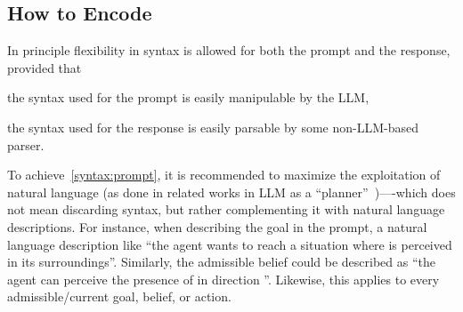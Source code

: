 \documentclass[12pt,a4paper,openright,twoside]{book}
\begin{document}
\subsection{How to Encode}\label{sec:prompt-encoding}

In principle flexibility in syntax is allowed for both the prompt and the response,
provided that
%
\begin{inlinelist}
    \item\label{syntax:prompt} the syntax used for the prompt is easily manipulable by the \ac{LLM},
    \item\label{syntax:response} the syntax used for the response is easily parsable by some non-\ac{LLM}-based parser.
\end{inlinelist}


To achieve~\ref{syntax:prompt}, it is recommended to maximize the exploitation of natural language (as done in related works in \ac{LLM} as a ``planner''~\cite{Murugesan25a})----which does not mean discarding \agentspeak{} syntax, but rather complementing it with natural language descriptions.
%
For instance, when describing the goal  in the prompt, a natural language description like ``the agent wants to reach a situation where  is perceived in its surroundings''.
%
Similarly, the admissible belief  could be described as ``the agent can perceive the presence of  in direction ''.
%
Likewise, this applies to every admissible/current goal, belief, or action.

\end{document}
